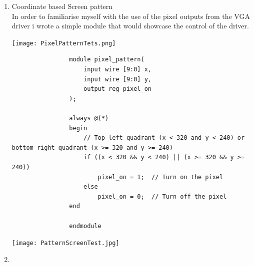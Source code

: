\documentclass{article}
\begin{document}
\begin{enumerate}
\begin{enumerate}
    \newpage        
    \item Coordinate based Screen pattern\\
    In order to familiarise myself with the use of the pixel outputs from the VGA driver i wrote a simple module that would showcase the control of the driver.
        \begin{center}
            \texttt{[image: PixelPatternTets.png]}
            \begin{lstlisting}
                module pixel_pattern(
                    input wire [9:0] x,
                    input wire [9:0] y,
                    output reg pixel_on            
                );
                
                always @(*)
                begin
                    // Top-left quadrant (x < 320 and y < 240) or bottom-right quadrant (x >= 320 and y >= 240)
                    if ((x < 320 && y < 240) || (x >= 320 && y >= 240))
                        pixel_on = 1;  // Turn on the pixel
                    else
                        pixel_on = 0;  // Turn off the pixel
                end
                
                endmodule
            \end{lstlisting}
            \texttt{[image: PatternScreenTest.jpg]}
            
        \end{center}
    \item
    
        
    \end{enumerate}
\end{enumerate}
\end{document}
